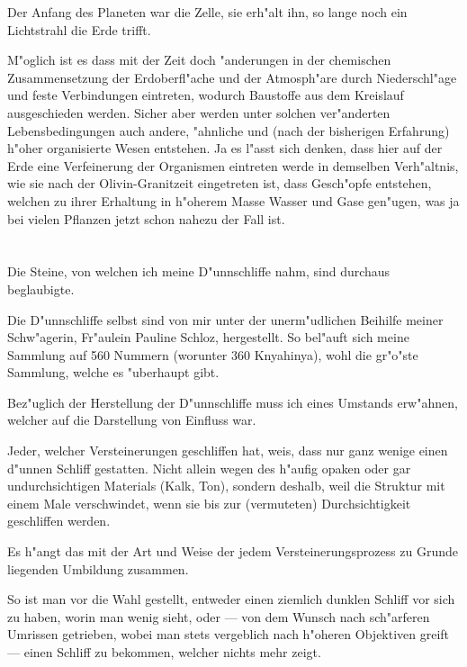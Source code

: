 \documentclass[a4paper, 11pt, oneside]{article}
\begin{document}
Der Anfang des Planeten war die Zelle, sie erh"alt ihn, so lange noch ein Lichtstrahl die Erde trifft.

M"oglich ist es dass mit der Zeit doch "anderungen in der chemischen Zusammensetzung der Erdoberfl"ache und der Atmosph"are durch Niederschl"age und feste Verbindungen eintreten, wodurch Baustoffe aus dem Kreislauf ausgeschieden werden. Sicher aber werden unter solchen ver"anderten Lebensbedingungen auch andere, "ahnliche und (nach der bisherigen Erfahrung) h"oher organisierte Wesen entstehen. Ja es l"asst sich denken, dass hier auf der Erde eine Verfeinerung der Organismen eintreten werde in demselben Verh"altnis, wie sie nach der Olivin-Granitzeit eingetreten ist, dass Gesch"opfe entstehen, welchen zu ihrer Erhaltung in h"oherem Masse Wasser und Gase gen"ugen, was ja bei vielen Pflanzen jetzt schon nahezu der Fall ist.
\clearpage
\section{}
\subsection{}
\paragraph{}
Die Steine, von welchen ich meine D"unnschliffe nahm, sind durchaus beglaubigte.

Die D"unnschliffe selbst sind von mir unter der unerm"udlichen Beihilfe meiner Schw"agerin, Fr"aulein Pauline Schloz, hergestellt. So bel"auft sich meine Sammlung auf 560 Nummern (worunter 360 Knyahinya), wohl die gr"o"ste Sammlung, welche es "uberhaupt gibt.

Bez"uglich der Herstellung der D"unnschliffe muss ich eines Umstands erw"ahnen, welcher auf die Darstellung von Einfluss war.

Jeder, welcher Versteinerungen geschliffen hat, weis, dass nur ganz wenige einen d"unnen Schliff gestatten. Nicht allein wegen des h"aufig opaken oder gar undurchsichtigen Materials (Kalk, Ton), sondern deshalb, weil die Struktur mit einem Male verschwindet, wenn sie bis zur (vermuteten) Durchsichtigkeit geschliffen werden.

Es h"angt das mit der Art und Weise der jedem Versteinerungsprozess zu Grunde liegenden Umbildung zusammen.

So ist man vor die Wahl gestellt, entweder einen ziemlich dunklen Schliff vor sich zu haben, worin man wenig sieht, oder --- von dem Wunsch nach sch"arferen Umrissen getrieben, wobei man stets vergeblich nach h"oheren Objektiven greift --- einen Schliff zu bekommen, welcher nichts mehr zeigt.
\end{document}
